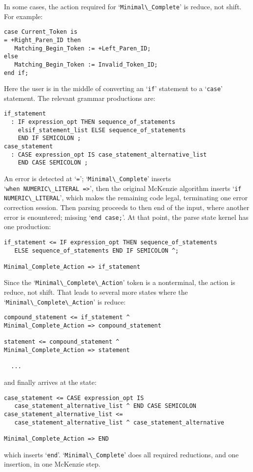 \documentclass{article}
\newcommand{\code}[1]{`\lstinline|#1|'}
\begin{document}
In some cases, the action required for \code{Minimal\_Complete} is
reduce, not shift. For example:
\begin{lstlisting}
case Current_Token is
= +Right_Paren_ID then
   Matching_Begin_Token := +Left_Paren_ID;
else
   Matching_Begin_Token := Invalid_Token_ID;
end if;
\end{lstlisting}
Here the user is in the middle of converting an \code{if} statement to
a \code{case} statement. The relevant grammar productions are:
\begin{verbatim}
if_statement
  : IF expression_opt THEN sequence_of_statements
    elsif_statement_list ELSE sequence_of_statements
    END IF SEMICOLON ;
case_statement
  : CASE expression_opt IS case_statement_alternative_list
    END CASE SEMICOLON ;
\end{verbatim}
An error is detected at \code{=}; \code{Minimal\_Complete} inserts\\
\code{when NUMERIC\_LITERAL =>}, then the original McKenzie algorithm
inserts \code{if NUMERIC\_LITERAL}, which makes the remaining code
legal, terminating one error correction session. Then parsing proceeds
to then end of the input, where another error is enountered; missing
\code{end case;}. At that point, the parse state kernel has one
production:
\begin{verbatim}
if_statement <= IF expression_opt THEN sequence_of_statements
   ELSE sequence_of_statements END IF SEMICOLON ^;

Minimal_Complete_Action => if_statement
\end{verbatim}
Since the \code{Minimal\_Complete\_Action} token is a nonterminal, the action
is reduce, not shift. That leads to several more states where the\\
\code{Minimal\_Complete\_Action} is reduce:
\begin{verbatim}
compound_statement <= if_statement ^
Minimal_Complete_Action => compound_statement

statement <= compound_statement ^
Minimal_Complete_Action => statement

  ...
\end{verbatim}

and finally arrives at the state:
\begin{verbatim}
case_statement <= CASE expression_opt IS
   case_statement_alternative_list ^ END CASE SEMICOLON
case_statement_alternative_list <=
   case_statement_alternative_list ^ case_statement_alternative

Minimal_Complete_Action => END
\end{verbatim}
which inserts \code{end}. \code{Minimal\_Complete} does all required
reductions, and one insertion, in one McKenzie step.
\end{document}
